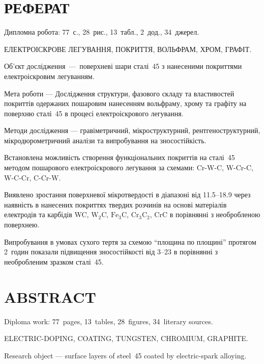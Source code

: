 \documentclass[a4paper,fontsize=14bp,ukrainian]{extreport}
\begin{document}
%
%


\setcounter{page}{4}

\chapter*{РЕФЕРАТ}
\thispagestyle{empty}
Дипломна робота: 77~с., 28~рис., 13~табл., 2~дод., 34~джерел.\vspace{5mm}

ЕЛЕКТРОІСКРОВЕ ЛЕГУВАННЯ, ПОКРИТТЯ, ВОЛЬФРАМ, ХРОМ, ГРАФІТ.\vspace{5mm}

Об'єкт дослідження~---~поверхневі шари сталі~45 з нанесеними покриттями електроіскровим легуванням.

Мета роботи --- Дослідження структури, фазового складу та властивостей покриттів одержаних пошаровим нанесенням вольфраму, хрому та графіту на поверхню сталі~45 в процесі електроіскрового легування.

Методи дослідження --- гравіметричний, мікроструктурний, рентгеноструктурний, мікродюрометричний аналізи та випробування на зносостійкість.

Встановлена можливість створення функціональних покриттів на сталі~45 методом пошарового електроіскрового легування за схемами: Cr-W-C, W-Cr-C, W-C-Cr, C-Cr-W.

Виявлено зростання поверхневої мікротвердості в діапазоні від \SIrange{11.5}{18.9}{\gpa} через наявність в нанесених покриттях твердих розчинів на основі матеріалів електродів та карбідів WC, $\text{W}_2\text{C}$, $\text{Fe}_{3}\text{C}$, $\text{Cr}_{3}\text{C}_{2}$, $\text{CrC}$ в порівнянні з необробленою поверхнею.

Випробування в умовах сухого тертя за схемою ``площина по площині'' протягом 2~годин показали підвищення зносостійкості від \SIrange{3}{23}{\mal} в порівнянні з необробленим зразком сталі~45.

\chapter*{ABSTRACT}
\thispagestyle{empty}
Diploma work:  77~pages,  13~tables,  28~figures,  34~literary sources. \vspace{5mm}

ELECTRIC-DOPING, COATING, TUNGSTEN, CHROMIUM, GRAPHITE. \vspace{5mm}

Research object --- surface layers of steel~45 coated by electric-spark alloying.
\end{document}
